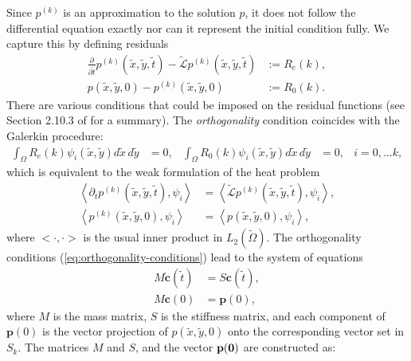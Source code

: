 Since $p^{(k)}$ is an approximation to the solution $p$, it
does not follow the differential equation exactly nor can it represent
the initial condition fully. We capture this by defining residuals
\begin{align*}
  \frac{\partial}{\partial \tilde{t}} p^{(k)}(\tilde{x},\tilde{y},\tilde{t}) - \tilde{\mathcal{L}}p^{(k)}(\tilde{x},\tilde{y},\tilde{t}) &:= R_e(k), \\
  p(\tilde{x},\tilde{y},0) - p^{(k)}(\tilde{x},\tilde{y},0) &:= R_0(k).
\end{align*}
There are various conditions that could be imposed on the residual
functions (see Section 2.10.3 of \cite{norrie1973finite} for a
summary). The \textit{orthogonality} condition coincides with the
Galerkin procedure:
\begin{align}
  \displaystyle \int_{\Omega} R_e(k) \psi_i(\tilde{x},\tilde{y}) d\tilde{x}\,d\tilde{y} &= 0,& \displaystyle \int_{\Omega} R_0(k) \psi_i(\tilde{x},\tilde{y}) d\tilde{x}\,d\tilde{y} &= 0,& i = 0,\ldots k, \label{eq:orthogonality-conditions}
\end{align}
which is equivalent to the weak formulation of the heat problem
\begin{align*}
  \left< \partial_t p^{(k)}(\tilde{x},\tilde{y},\tilde{t}), \psi_i \right> &= \left<\tilde{\mathcal{L}}p^{(k)}(\tilde{x},\tilde{y},\tilde{t}), \psi_i \right>, \\
  \left< p^{(k)}(\tilde{x},\tilde{y},0), \psi_i \right> &= \left<p(\tilde{x},\tilde{y},0), \psi_i\right>,
\end{align*}
where $<\cdot, \cdot>$ is the usual inner product in
$L_2(\tilde{\Omega})$. The orthogonality conditions
(\ref{eq:orthogonality-conditions}) lead to the system of equations
\begin{align}
  M \mathbf{\dot{c}}(\tilde{t}) &= S \mathbf{c}(\tilde{t}), \label{eq:orthogonality-conditions-mat-1} \\
  M \mathbf{c}(0) &= \mathbf{p}(0), \label{eq:orthogonality-conditions-mat-2}
\end{align}
where $M$ is the mass matrix, $S$ is the stiffness matrix, and each
component of $\mathbf{p}(0)$ is the vector projection of
$p(\tilde{x},\tilde{y},0)$ onto the corresponding vector set in
$S_k$. The matrices $M$ and $S$, and the vector $\bf{p}(0)$ are constructed as:
